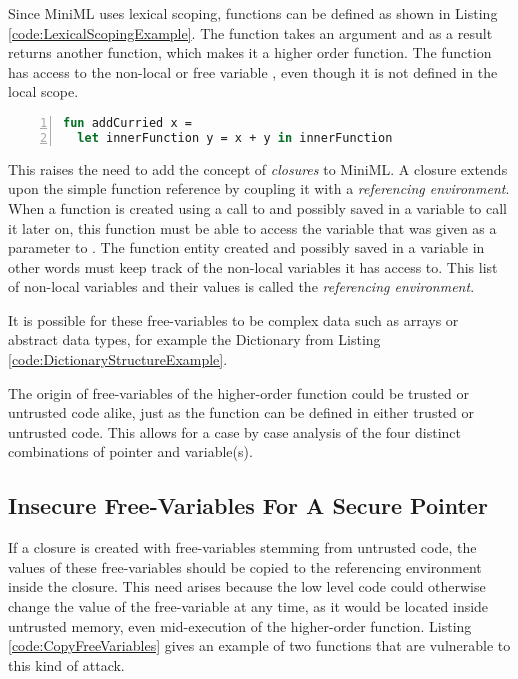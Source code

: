 \documentclass[10pt,a4paper]{report}
\begin{document}
Since \mbox{MiniML} uses lexical scoping, functions can be defined as shown in Listing \ref{code:LexicalScopingExample}. The function  takes an argument  and as a result returns another function, which makes it a higher order function. The function  has access to the non-local or free variable , even though it is not defined in the local scope.

\begin{lstlisting}[frame=single, language=ML,caption=The use of lexical scoping calls for closures., label=code:LexicalScopingExample,numbers=left]
fun addCurried x = 
  let innerFunction y = x + y in innerFunction
\end{lstlisting}
\label{code:LexicalScopingExample}

This raises the need to add the concept of \emph{closures} to \mbox{MiniML}. A closure extends upon the simple function reference by coupling it with a \emph{referencing environment}. 
When a function is created using a call to  and possibly saved in a variable to call it later on, this function must be able to access the variable  that was given as a parameter to .
The function entity created and possibly saved in a variable in other words must keep track of the non-local variables it has access to.
This list of non-local variables and their values is called the \emph{referencing environment}.

It is possible for these free-variables to be complex data such as arrays or abstract data types, for example the Dictionary from Listing \ref{code:DictionaryStructureExample}. 

The origin of free-variables of the higher-order function could be trusted or untrusted code alike, just as the function can be defined in either trusted or untrusted code.
This allows for a case by case analysis of the four distinct combinations of pointer and variable(s).

\subsection{Insecure Free-Variables For A Secure Pointer}
If a closure is created with free-variables stemming from untrusted code, the values of these free-variables should be copied to the referencing environment inside the closure. 
This need arises because the low level code could otherwise change the value of the free-variable at any time, as it would be located inside untrusted memory, even mid-execution of the higher-order function.
Listing \ref{code:CopyFreeVariables} gives an example of two functions that are vulnerable to this kind of attack.
\end{document}
